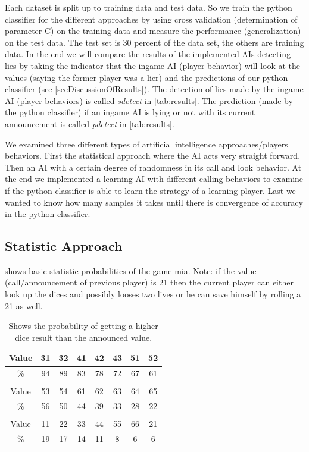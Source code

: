 \documentclass[11pt]{article}
\begin{document}
Each dataset is split up to training data and test data. So we train the python classifier for the different approaches by using cross validation (determination of parameter C) on the training data and measure the performance (generalization) on the test data. The test set is 30 percent of the data set, the others are training data.
In the end we will compare the results of the implemented AIs detecting lies by taking the indicator that the ingame AI (player behavior) will look at the values (saying the former player was a lier) and the predictions of our python classifier (see \cref{secDiscussionOfResults}).
The detection of lies made by the ingame AI (player behaviors) is called \emph{sdetect} in \cref{tab:results}. The prediction (made by the python classifier) if an ingame AI is lying or not with its current announcement  is called \emph{pdetect} in \cref{tab:results}.


We examined three different types of artificial intelligence approaches/players behaviors. First the statistical approach where the AI acts very straight forward. Then an AI with a certain degree of randomness in its call and look behavior. At the end we implemented a learning AI with different calling behaviors to examine if the python classifier is able to learn the strategy of a learning player. Last we wanted to know how many samples it takes until there is convergence of accuracy in the python classifier. 

\subsection{Statistic Approach}
\label{ssec:statistic}
 shows basic statistic probabilities of the game mia. Note: if the value (call/announcement of previous player) is 21 then the current player can either look up the dices and possibly looses two lives or he can save himself by rolling a 21 as well. 

\begin{table}[H]
	\centering
	\small 
	\begin{tabular}{|c|c|c|c|c|c|c|c|}
		\hline 
		Value&31&32&41&42&43&51&52\\ \hline
		\%&94&89&83&78&72&67&61\\ \hline 
		&&&&&&& \\ \hline
		Value&53&54&61&62&63&64&65\\ \hline
		\%&56&50&44&39&33&28&22\\ \hline 
		&&&&&&& \\ \hline
		Value&11&22&33&44&55&66&21\\ \hline
		\%&19&17&14&11&8&6&6 \\ \hline
				
	\end{tabular}
	\caption{Shows the probability of getting a higher dice result than the announced value.}
	\label{tbl:stat1}
\end{table}
\end{document}
